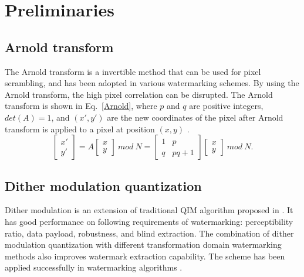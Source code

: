 \documentclass[runningheads]{llncs}
\begin{document}
\section{Preliminaries}
\subsection{Arnold transform}
The Arnold transform is a invertible method that can be used for pixel scrambling, and has been adopted in various watermarking schemes. By using the Arnold transform, the high pixel correlation can be disrupted. The Arnold transform is shown in Eq.~\ref{Arnold}, where $p$ and $q$ are positive integers, $det(A) = 1$, and $(x', y')$ are the new coordinates of the pixel after Arnold transform is applied to a pixel at position $(x, y)$ \cite{Chow2017}.
\begin{equation}
\left[\begin{array}{c}x'\\y'\end{array}\right]=A\left[\begin{array}{c}x\\y\end{array}\right]\ mod\ N=\left[\begin{array}{cc}1 & p\\q & pq+1\end{array}\right]\left[\begin{array}{c}x\\y\end{array}\right]\ mod\ N.
\label{Arnold}
\end{equation}
\subsection{Dither modulation quantization}
Dither modulation is an extension of traditional QIM algorithm proposed in \cite{chen2001quantization}. It has good performance on following requirements of watermarking: perceptibility ratio, data payload, robustness, and blind extraction. The combination of dither modulation quantization with different transformation domain watermarking methods also improves watermark extraction capability. The scheme has been applied successfully in watermarking algorithms \cite{avila2018watermarking,deng2009local,papakostas2014moment,zhu2016optimal}.
\end{document}
